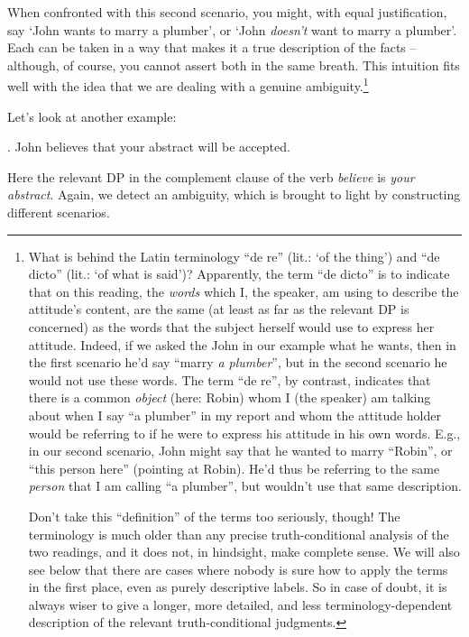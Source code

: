 When confronted with this second scenario, you might, with equal justification, say `John wants to marry a plumber', or `John \emph{doesn't} want to marry a plumber'. Each can be taken in a way that makes it a true description of the facts -- although, of course, you cannot assert both in the same breath. This intuition fits well with the idea that we are dealing with a genuine ambiguity.\footnote{What is behind the Latin terminology ``de re'' (lit.: `of the thing') and ``de dicto'' (lit.: `of what is said')? Apparently, the term ``de dicto'' is to indicate that on this reading, the \emph{words} which I, the speaker, am using to describe the attitude's content, are the same (at least as far as the relevant DP is concerned) as the words that the subject herself would use to express her attitude. Indeed, if we asked the John in our example what he wants, then in the first scenario he'd say ``marry \emph{a plumber}'', but in the second scenario he would not use these words. The term ``de re'', by contrast, indicates that there is a common \emph{object} (here: Robin) whom I (the speaker) am talking about when I say ``a plumber'' in my report and whom the attitude holder would be referring to if he were to express his attitude in his own words. E.g., in our second scenario, John might say that he wanted to marry ``Robin'', or ``this person here'' (pointing at Robin). He'd thus be referring to the same \emph{person} that I am calling ``a plumber'', but wouldn't use that same description.

Don't take this ``definition'' of the terms too seriously, though! The terminology is much older than any precise truth-conditional analysis of the two readings, and it does not, in hindsight, make complete sense. We will also see below that there are cases where nobody is sure how to apply the terms in the first place, even as purely descriptive labels. So in case of doubt, it is always wiser to give a longer, more detailed, and less terminology-dependent description of the relevant truth-conditional judgments. }

Let's look at another example:

\ex. John believes that your abstract will be accepted.

Here the relevant DP in the complement clause of the verb \emph{believe} is \emph{your abstract}. Again, we detect an ambiguity, which is brought to light by constructing different scenarios.

